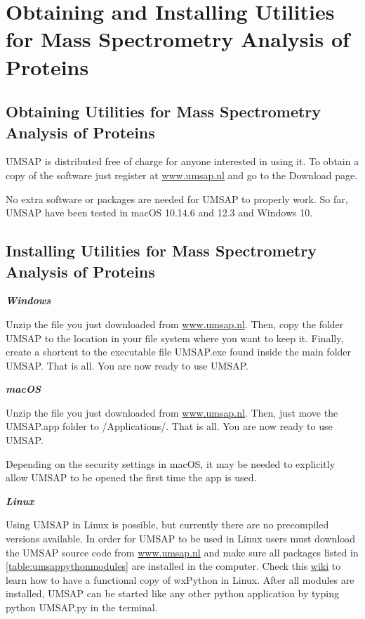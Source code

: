 \chapter{Obtaining and Installing Utilities for Mass Spectrometry Analysis of Proteins}

\section{Obtaining Utilities for Mass Spectrometry Analysis of Proteins}

UMSAP is distributed free of charge for anyone interested in using it. To obtain
a copy of the software just register at \href{https://www.umsap.nl}{www.umsap.nl}
and go to the Download page.

No extra software or packages are needed for UMSAP to properly work. So far, 
UMSAP have been tested in macOS \num[parse-numbers=false]{10.14.6} and
\num[parse-numbers=false]{12.3} and Windows \num{10}.

\section{Installing Utilities for Mass Spectrometry Analysis of Proteins}

\textit{\textbf{Windows}}

Unzip the file you just downloaded from \href{https://www.umsap.nl}{www.umsap.nl}.
Then, copy the folder UMSAP to the location in your file system where you want
to keep it. Finally, create a shortcut to the executable file UMSAP.exe found
inside the main folder UMSAP. That is all. You are now ready to use UMSAP.

\textit{\textbf{macOS}}

Unzip the file you just downloaded from \href{https://www.umsap.nl}{www.umsap.nl}.
Then, just move the UMSAP.app folder to /Applications/. That is all. You are now
ready to use UMSAP. 

Depending on the security settings in macOS, it may be needed to explicitly allow
UMSAP to be opened the first time the app is used.

\textit{\textbf{Linux}}

Using UMSAP in Linux is possible, but currently there are no precompiled versions
available. In order for UMSAP to be used in Linux users must download the UMSAP source
code from \href{https://www.umsap.nl}{www.umsap.nl} and make sure all packages listed
in \autoref{table:umsappythonmodules} are installed in the computer. Check this
\href{https://wiki.wxpython.org/How%20to%20install%20wxPython}{wiki} to learn
how to have a functional copy of wxPython in Linux. After all modules are installed,
UMSAP can be started like any other python application by typing python UMSAP.py in
the terminal.

